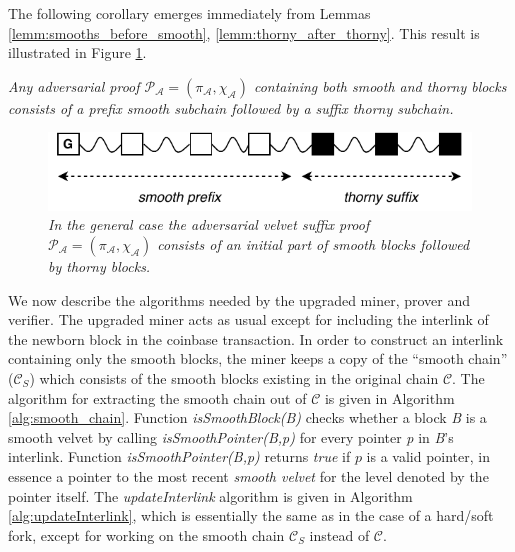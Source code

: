 The following corollary emerges immediately from Lemmas 
\ref{lemm:smooths_before_smooth}, \ref{lemm:thorny_after_thorny}. This result is illustrated in Figure \ref{fig:adversarial_velvet_proof}.

\begin{corollary}
	\textit{Any adversarial proof $\mathcal{P_A} = (\pi_\mathcal{A}, \chi_\mathcal{A})$ containing both smooth and thorny blocks consists of a prefix smooth subchain followed by a suffix thorny subchain.}
	\label{cor:adversarial_proof_scheme}
\end{corollary}

\begin{figure}[h!]
	\begin{center}
		\includegraphics[scale=0.75]{figures/adversarial_velvet_proof.pdf}
	\end{center}
	\caption{\textit{In the general case the adversarial velvet suffix proof $\mathcal{P_A} = (\pi_\mathcal{A}, \chi_\mathcal{A})$ consists of an initial part of smooth blocks followed by thorny blocks.}}
	\label{fig:adversarial_velvet_proof}
\end{figure}

We now describe the algorithms needed by the upgraded miner, prover and verifier. The upgraded miner acts as usual except for including the interlink of the newborn block in the coinbase transaction. In order to construct an interlink containing only the smooth blocks, the miner keeps a copy of the ``smooth chain'' ($\mathcal{C}_S$) which consists of the smooth blocks existing in the original chain $\mathcal{C}$. The algorithm for extracting the smooth chain out of $\mathcal{C}$ is given in Algorithm 
\ref{alg:smooth_chain}. Function \textit{isSmoothBlock(B)} checks whether a
block \textit{B} is a smooth velvet by calling \textit{isSmoothPointer(B,p)}
for every pointer \textit{p} in \textit{B}'s interlink. Function
\textit{isSmoothPointer(B,p)} returns \emph{true} if $p$ is a valid 
pointer, in essence a pointer to the most recent \emph{smooth velvet}
for the level denoted by the pointer itself. The \textit{updateInterlink} algorithm is given in Algorithm \ref{alg:updateInterlink}, which is essentially the same as in the case of a hard/soft fork, except for working on the smooth chain $\mathcal{C}_S$ instead of $\mathcal{C}$.

